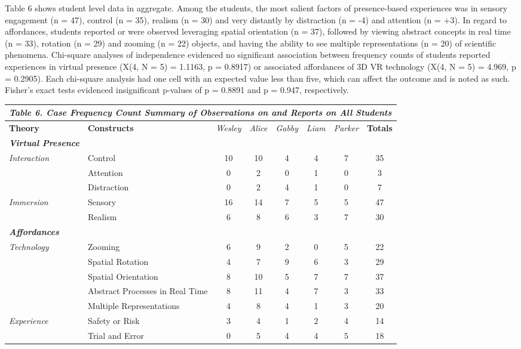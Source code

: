 \documentclass[11.5pt]{sig-alternate} %
\begin{document}
\begin{large}
Table 6 shows student level data in aggregate.  Among the students, the most salient factors of presence-based experiences was in sensory engagement (n = 47), control (n = 35), realism (n = 30) and very distantly by distraction (n = -4) and attention (n = +3).  In regard to affordances, students reported or were observed leveraging spatial orientation (n = 37), followed by viewing abstract concepts in real time (n = 33), rotation (n = 29) and zooming (n = 22) objects, and having the ability to see multiple representations (n = 20) of scientific phenomena. Chi-square analyses of independence evidenced no significant association between frequency counts of students reported experiences in virtual presence (X(4, N = 5) = 1.1163, p = 0.8917) or associated affordances of 3D VR technology (X(4, N = 5) = 4.969, p = 0.2905). Each chi-square analysis had one cell with an expected value less than five, which can affect the outcome and is noted as such. Fisher’s exact tests evidenced insignificant p-values of p = 0.8891 and p = 0.947, respectively. 

\begin{table}
\begin{tabular}[h]{llcccccc}
\hline
\multicolumn{8}{l}{\textit{\textbf{Table 6.} Case Frequency Count Summary of Observations on and Reports on All Students}} \\
\hline
\textbf{Theory} & \textbf{Constructs} & \textit{Wesley} & \textit{Alice} & \textit{Gabby} & \textit{Liam} & \textit{Parker} & \textbf{Totals}\\
\hline
\textit{\textbf{Virtual Presence}} & & & & & & & \\
\textit{Interaction} & Control & 10 & 10 & 4 & 4 & 7 & 35 \\
 & Attention & 0 & 2 & 0 & 1 & 0 & 3 \\
 & Distraction & 0 & 2 & 4 & 1 & 0 & 7\\
\textit{Immersion} & Sensory & 16 & 14 & 7 & 5 & 5 & 47 \\
 & Realism & 6 & 8 & 6 & 3 & 7 & 30 \\
\hline
\textit{\textbf{Affordances}} & & & & & &  &\\
\textit{Technology} & Zooming & 6 & 9 & 2 & 0 & 5 & 22 \\
 & Spatial Rotation & 4 & 7 & 9 & 6 & 3 & 29 \\
 & Spatial Orientation & 8 & 10 & 5 & 7 & 7 & 37 \\
 & Abstract Processes in Real Time & 8 & 11 & 4 & 7 & 3 & 33 \\
 & Multiple Representations & 4 & 8 & 4 & 1 & 3 & 20 \\
\textit{Experience} & Safety or Risk & 3 & 4 & 1 & 2 & 4 & 14 \\
 & Trial and Error & 0 & 5 & 4 & 4 & 5 & 18 \\
\hline
\end{tabular}
\end{table}


\end{large}
\end{document}
